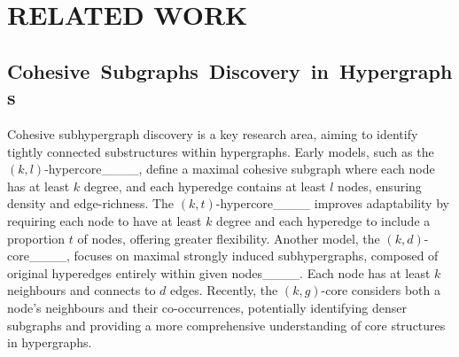 \section{RELATED WORK}
\label{sec:relatedwork}






\subsection{\mbox{Cohesive Subgraphs Discovery in Hypergraphs}}
Cohesive subhypergraph discovery is a key research area, aiming to identify tightly connected substructures within hypergraphs. Early models, such as the $(k, l)$-hypercore____, define a maximal cohesive subgraph where each node has at least $k$ degree, and each hyperedge contains at least $l$ nodes, ensuring density and edge-richness. The $(k, t)$-hypercore____ improves adaptability by requiring each node to have at least $k$ degree and each hyperedge to include a proportion $t$ of nodes, offering greater flexibility. Another model, the $(k, d)$-core____, focuses on maximal strongly induced subhypergraphs, composed of original hyperedges entirely within given nodes____. Each node has at least $k$ neighbours and connects to $d$ edges. Recently, the $(k, g)$-core considers both a node's neighbours and their co-occurrences, potentially identifying denser subgraphs and providing a more comprehensive understanding of core structures in hypergraphs.

